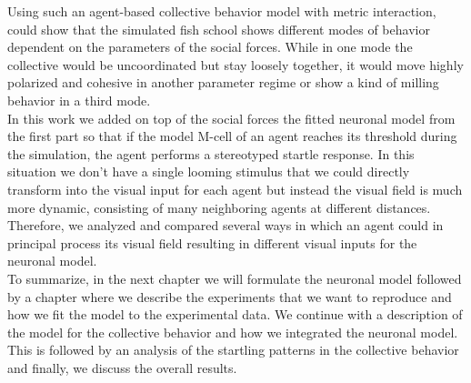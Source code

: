 	Using such an agent-based collective behavior model with metric interaction, \cite{Couzin2002} 
	could show that the simulated fish school shows different modes of behavior dependent on the 
	parameters of the social forces.
	While in one mode the collective would be uncoordinated but stay loosely together, it would 
	move highly polarized and cohesive in another parameter regime or show a kind of milling 
	behavior in a third mode.\\
    In this work we added on top of the social forces the fitted neuronal model from the first part so that if the model M-cell of an agent reaches its threshold during the simulation, the agent performs a stereotyped startle response.
    In this situation we don't have a single looming stimulus that we could directly transform into the visual input for each agent but instead the visual field is much more dynamic, consisting of many neighboring agents at different distances.
    Therefore, we analyzed and compared several ways in which an agent could in principal process its visual field resulting in different visual inputs for the neuronal model.\\
    To summarize, in the next chapter we will formulate the neuronal model followed by a chapter where we describe the experiments that we want to reproduce and how we fit the model to the experimental data.
    We continue with a description of the model for the collective behavior and how we integrated the neuronal model.
    This is followed by an analysis of the startling patterns in the collective behavior and finally, we discuss the overall results.